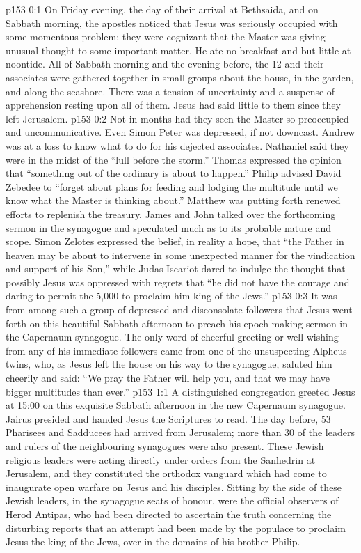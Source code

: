 \author{Midwayer Commission}
\vs p153 0:1 On Friday evening, the day of their arrival at Bethsaida, and on Sabbath morning, the apostles noticed that Jesus was seriously occupied with some momentous problem; they were cognizant that the Master was giving unusual thought to some important matter. He ate no breakfast and but little at noontide. All of Sabbath morning and the evening before, the 12 and their associates were gathered together in small groups about the house, in the garden, and along the seashore. There was a tension of uncertainty and a suspense of apprehension resting upon all of them. Jesus had said little to them since they left Jerusalem.
\vs p153 0:2 Not in months had they seen the Master so preoccupied and uncommunicative. Even Simon Peter was depressed, if not downcast. Andrew was at a loss to know what to do for his dejected associates. Nathaniel said they were in the midst of the “lull before the storm.” Thomas expressed the opinion that “something out of the ordinary is about to happen.” Philip advised David Zebedee to “forget about plans for feeding and lodging the multitude until we know what the Master is thinking about.” Matthew was putting forth renewed efforts to replenish the treasury. James and John talked over the forthcoming sermon in the synagogue and speculated much as to its probable nature and scope. Simon Zelotes expressed the belief, in reality a hope, that “the Father in heaven may be about to intervene in some unexpected manner for the vindication and support of his Son,” while Judas Iscariot dared to indulge the thought that possibly Jesus was oppressed with regrets that “he did not have the courage and daring to permit the 5,000 to proclaim him king of the Jews.”
\vs p153 0:3 It was from among such a group of depressed and disconsolate followers that Jesus went forth on this beautiful Sabbath afternoon to preach his epoch\hyp{}making sermon in the Capernaum synagogue. The only word of cheerful greeting or well\hyp{}wishing from any of his immediate followers came from one of the unsuspecting Alpheus twins, who, as Jesus left the house on his way to the synagogue, saluted him cheerily and said: “We pray the Father will help you, and that we may have bigger multitudes than ever.”
\vs p153 1:1 A distinguished congregation greeted Jesus at 15:00 on this exquisite Sabbath afternoon in the new Capernaum synagogue. Jairus presided and handed Jesus the Scriptures to read. The day before, 53 Pharisees and Sadducees had arrived from Jerusalem; more than 30 of the leaders and rulers of the neighbouring synagogues were also present. These Jewish religious leaders were acting directly under orders from the Sanhedrin at Jerusalem, and they constituted the orthodox vanguard which had come to inaugurate open warfare on Jesus and his disciples. Sitting by the side of these Jewish leaders, in the synagogue seats of honour, were the official observers of Herod Antipas, who had been directed to ascertain the truth concerning the disturbing reports that an attempt had been made by the populace to proclaim Jesus the king of the Jews, over in the domains of his brother Philip.

